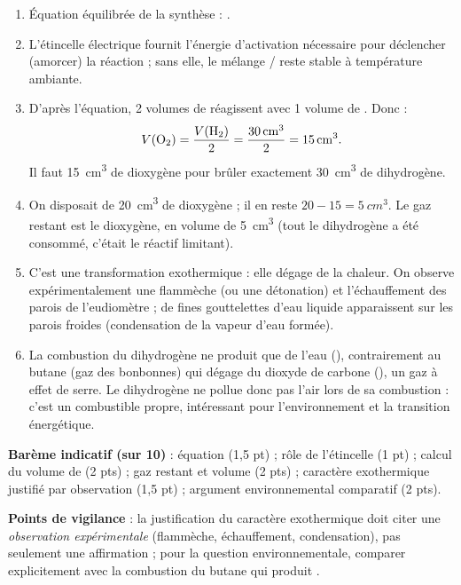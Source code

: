 \documentclass[11pt]{article}
\newcommand{\cle}[1]{{\popxbold\color{popdark}#1}}
\begin{document}
\begin{corrige}
\begin{enumerate}
\item Équation équilibrée de la synthèse : .
\item L'étincelle électrique fournit l'énergie d'activation nécessaire pour déclencher (amorcer) la réaction ; sans elle, le mélange / reste stable à température ambiante.
\item D'après l'équation, 2 volumes de  réagissent avec 1 volume de . Donc :
\[ V(\ce{O2}) = \frac{V(\ce{H2})}{2} = \frac{\SI{30}{cm^3}}{2} = \SI{15}{cm^3}. \]
Il faut \SI{15}{cm^3} de dioxygène pour brûler exactement \SI{30}{cm^3} de dihydrogène.
\item On disposait de \SI{20}{cm^3} de dioxygène ; il en reste $20 - 15 = \SI{5}{cm^3}$. Le gaz restant est le dioxygène, en volume de \SI{5}{cm^3} (tout le dihydrogène a été consommé, c'était le réactif limitant).
\item C'est une transformation \cle{exothermique} : elle dégage de la chaleur. On observe expérimentalement une flammèche (ou une détonation) et l'échauffement des parois de l'eudiomètre ; de fines gouttelettes d'eau liquide apparaissent sur les parois froides (condensation de la vapeur d'eau formée).
\item La combustion du dihydrogène ne produit que de l'eau (), contrairement au butane (gaz des bonbonnes) qui dégage du dioxyde de carbone (), un gaz à effet de serre. Le dihydrogène ne pollue donc pas l'air lors de sa combustion : c'est un combustible propre, intéressant pour l'environnement et la transition énergétique.
\end{enumerate}
\textbf{Barème indicatif (sur 10)} : équation (1,5 pt) ; rôle de l'étincelle (1 pt) ; calcul du volume de  (2 pts) ; gaz restant et volume (2 pts) ; caractère exothermique justifié par observation (1,5 pt) ; argument environnemental comparatif (2 pts).

\textbf{Points de vigilance} : la justification du caractère exothermique doit citer une \emph{observation expérimentale} (flammèche, échauffement, condensation), pas seulement une affirmation ; pour la question environnementale, comparer explicitement avec la combustion du butane qui produit .
\end{corrige}
\end{document}
